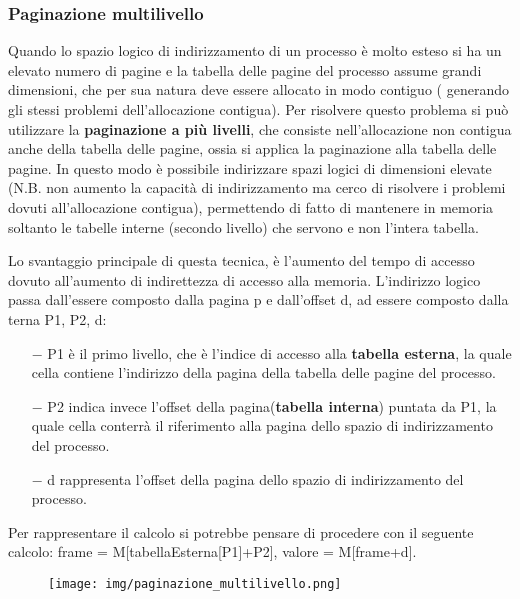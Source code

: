 \documentclass{article}
\begin{document}
\subsubsection{Paginazione multilivello}
\noindent Quando lo spazio logico di indirizzamento di un processo è molto esteso si ha un elevato numero di pagine e la tabella delle
 pagine del processo assume grandi dimensioni, che per sua natura deve essere allocato in modo contiguo ( generando gli stessi problemi 
 dell'allocazione contigua). Per risolvere questo problema si può utilizzare la \textbf{paginazione a più livelli}, che 
 consiste nell'allocazione non contigua anche della tabella delle pagine, ossia si applica la paginazione alla tabella delle pagine.
 In questo modo è possibile indirizzare spazi logici di dimensioni elevate (N.B. non aumento la capacità di indirizzamento ma cerco di risolvere i problemi
 dovuti all'allocazione contigua), permettendo di fatto di mantenere in memoria soltanto le
tabelle interne (secondo livello) che servono e non l'intera tabella.

\noindent Lo svantaggio principale di questa tecnica, è l'aumento del tempo di accesso dovuto all'aumento di indirettezza di accesso
 alla memoria. L'indirizzo logico passa dall'essere composto dalla pagina p e dall'offset d, ad essere composto dalla terna P1, P2, d:
 \begin{itemize}
     \item[$-$] P1 è il primo livello, che è l'indice di accesso alla \textbf{tabella esterna}, la quale cella contiene l'indirizzo 
     della pagina della tabella delle pagine del processo.
     \item[$-$] P2 indica invece l'offset della pagina(\textbf{tabella interna}) puntata da P1, la quale cella conterrà il riferimento alla pagina dello spazio
     di indirizzamento del processo.
     \item[$-$] d rappresenta l'offset della pagina dello spazio di indirizzamento del processo. 
 \end{itemize} 

 \noindent Per rappresentare il calcolo si potrebbe pensare di procedere con il seguente calcolo: frame = M[tabellaEsterna[P1]+P2], 
 valore = M[frame+d].


 \begin{figure}[h!]
    \begin{center}
        \texttt{[image: img/paginazione\_multilivello.png]}     
    \end{center}
\end{figure}
\end{document}
